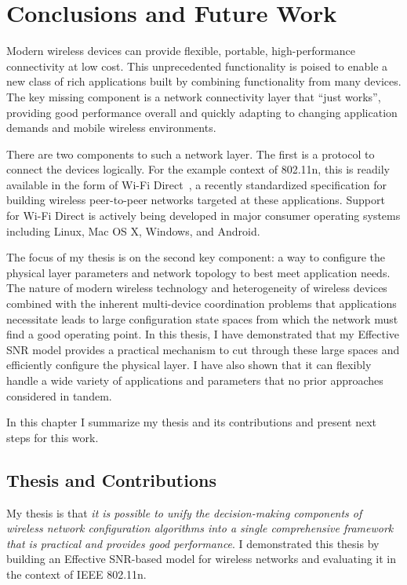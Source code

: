 \ifx\mainfile\undefined

\setcounter{chapter}{9} %
\fi

\cleardoublepage
\chapter{Conclusions and Future Work}
\label{chap:conclusion}

Modern wireless devices can provide flexible, portable, high-performance connectivity at low cost. This unprecedented functionality is poised to enable a new class of rich applications built by combining functionality from many devices. The key missing component is a network connectivity layer that ``just works'', providing good performance overall and quickly adapting to changing application demands and mobile wireless environments.

There are two components to such a network layer. The first is a protocol to connect the devices logically. For the example context of 802.11n, this is readily available in the form of Wi-Fi Direct~\cite{wifi_direct}, a recently standardized specification for building wireless peer-to-peer networks targeted at these applications. Support for Wi-Fi Direct is actively being developed in major consumer operating systems including Linux, Mac OS X, Windows, and Android.

The focus of my thesis is on the second key component: a way to configure the physical layer parameters and network topology to best meet application needs. The nature of modern wireless technology and heterogeneity of wireless devices combined with the inherent multi-device coordination problems that applications necessitate leads to large configuration state spaces from which the network must find a good operating point. In this thesis, I have demonstrated that my Effective SNR model provides a practical mechanism to cut through these large spaces and efficiently configure the physical layer. I have also shown that it can flexibly handle a wide variety of applications and parameters that no prior approaches considered in tandem.

In this chapter I summarize my thesis and its contributions and present next steps for this work.

\section{Thesis and Contributions}
My thesis is that \emph{it is possible to unify the decision-making components of wireless network configuration algorithms into a single comprehensive framework that is practical and provides good performance}. I demonstrated this thesis by building an Effective SNR-based model for wireless networks and evaluating it in the context of IEEE 802.11n.


